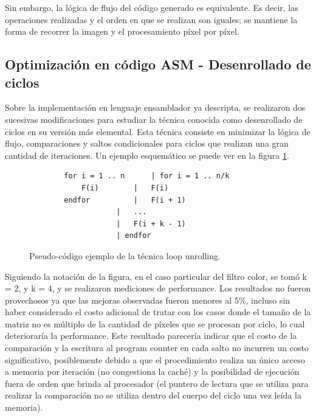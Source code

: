 Sin embargo, la lógica de flujo del código generado es equivalente. Es decir, las operaciones realizadas y el orden en que se realizan son iguales; se mantiene la forma de recorrer la imagen y el procesamiento píxel por píxel.

\subsection{Optimización en código ASM - Desenrollado de ciclos}
\label{sub:filtro-color-optimizaciones-asm}

Sobre la implementación en lenguaje ensamblador ya descripta, se realizaron dos sucesivas modificaciones para estudiar la técnica conocida como desenrollado de ciclos en su versión más elemental. Esta técnica consiste en minimizar la lógica de flujo, comparaciones y saltos condicionales para ciclos que realizan una gran cantidad de iteraciones. Un ejemplo esquemático se puede ver en la figura \ref{fig:filtro-color-loop-unrolling}.

\begin{figure}[h]
	\begin{mdframed}
	\begin{center}
		\begin{lstlisting}
		for i = 1 .. n		| for i = 1 .. n/k
			F(i)		| 	F(i)
		endfor			| 	F(i + 1)
					| 	...
					| 	F(i + k - 1)
					| endfor
		\end{lstlisting}
	\end{center}
	\end{mdframed}
	\caption{Pseudo-código ejemplo de la técnica loop unrolling.}
	\label{fig:filtro-color-loop-unrolling}
\end{figure}

Siguiendo la notación de la figura, en el caso particular del filtro color, se tomó k = 2, y k = 4, y se realizaron mediciones de performance. Los resultados no fueron provechosos ya que las mejoras observadas fueron menores al 5\%, incluso sin haber considerado el costo adicional de tratar con los casos donde el tamaño de la matriz no es múltiplo de la cantidad de píxeles que se procesan por ciclo, lo cual deterioraría la performance. Este resultado parecería indicar que el costo de la comparación y la escritura al program counter en cada salto no incurren un costo significativo, posiblemente debido a que el procedimiento realiza un único acceso a memoria por iteración (no congestiona la caché) y la posibilidad de ejecución fuera de orden que brinda al procesador (el puntero de lectura que se utiliza para realizar la comparación no se utiliza dentro del cuerpo del ciclo una vez leída la memoria).